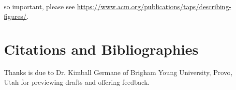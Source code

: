 \documentclass[sigconf]{acmart}
\begin{document}
so important, please see
\url{https://www.acm.org/publications/taps/describing-figures/}.

\section{Citations and Bibliographies}

\begin{acks}
    Thanks is due to Dr. Kimball Germane of Brigham Young University, Provo,
    Utah for previewing drafts and offering feedback.
\end{acks}



\end{document}

